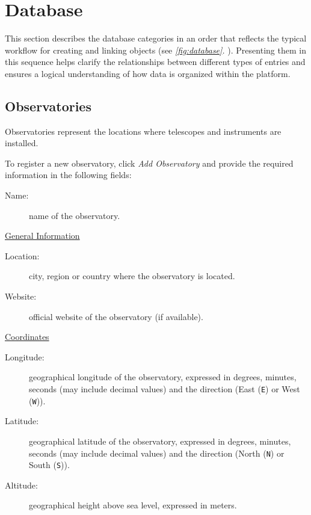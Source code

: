 

\section{Database}

This section describes the database categories in an order that reflects the typical workflow for creating and linking objects (see \textsl{\autoref{fig:database}. }). Presenting them in this sequence helps clarify the relationships between different types of entries and ensures a logical understanding of how data is organized within the platform.

\subsection{Observatories}

Observatories represent the locations where telescopes and instruments are installed. 

To register a new observatory, click \textsl{Add Observatory} and provide the required information in the following fields:

\begin{description}
	\item[Name:] name of the observatory.
\end{description}



\underline{General Information}

\begin{description}
	\item[Location:] city, region or country where the observatory is located.
	\item[Website:] official website of the observatory (if available).
\end{description}


\underline{Coordinates}

\begin{description}
	\item[Longitude:] geographical longitude of the observatory, expressed in degrees, minutes, seconds (may include decimal values) and the direction (East (\texttt{E}) or West (\texttt{W})).
	\item[Latitude:] geographical latitude of the observatory, expressed in degrees, minutes, seconds (may include decimal values) and the direction (North (\texttt{N}) or South (\texttt{S})).
	\item[Altitude:] geographical height above sea level, expressed in meters.
\end{description}

